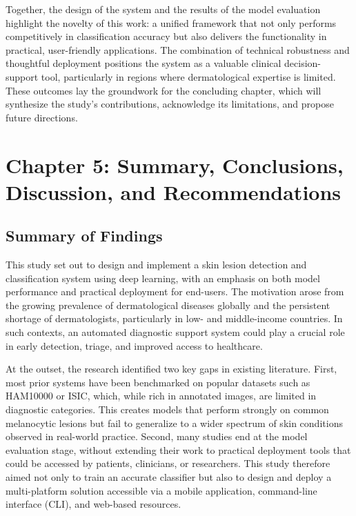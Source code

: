 \documentclass[
  12pt,
  oneside]{article}
\begin{document}
Together, the design of the system and the results of the model
evaluation highlight the novelty of this work: a unified framework that
not only performs competitively in classification accuracy but also
delivers the functionality in practical, user-friendly applications. The
combination of technical robustness and thoughtful deployment positions
the system as a valuable clinical decision-support tool, particularly in
regions where dermatological expertise is limited. These outcomes lay
the groundwork for the concluding chapter, which will synthesize the
study's contributions, acknowledge its limitations, and propose future
directions.

\newpage

\section{Chapter 5: Summary, Conclusions, Discussion, and
Recommendations}\label{chapter-5-summary-conclusions-discussion-and-recommendations}

\subsection{Summary of Findings}\label{summary-of-findings}

This study set out to design and implement a skin lesion detection and
classification system using deep learning, with an emphasis on both
model performance and practical deployment for end-users. The motivation
arose from the growing prevalence of dermatological diseases globally
and the persistent shortage of dermatologists, particularly in low- and
middle-income countries. In such contexts, an automated diagnostic
support system could play a crucial role in early detection, triage, and
improved access to healthcare.

At the outset, the research identified two key gaps in existing
literature. First, most prior systems have been benchmarked on popular
datasets such as HAM10000 or ISIC, which, while rich in annotated
images, are limited in diagnostic categories. This creates models that
perform strongly on common melanocytic lesions but fail to generalize to
a wider spectrum of skin conditions observed in real-world practice.
Second, many studies end at the model evaluation stage, without
extending their work to practical deployment tools that could be
accessed by patients, clinicians, or researchers. This study therefore
aimed not only to train an accurate classifier but also to design and
deploy a multi-platform solution accessible via a mobile application,
command-line interface (CLI), and web-based resources.
\end{document}
